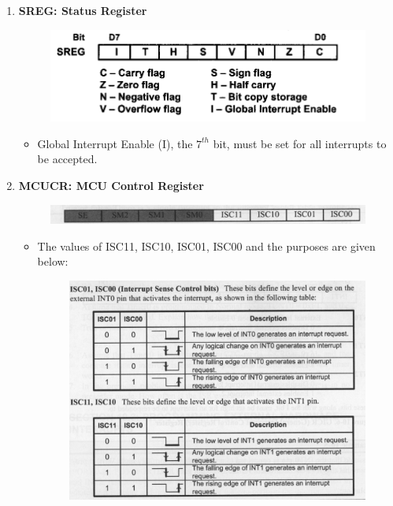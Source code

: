 \documentclass[titlepage, 11pt]{article}
\begin{document}
\begin{enumerate}
    \item \textbf{SREG: Status Register}
    \begin{figure}[H]
        \centering
        \includegraphics[width=0.75\linewidth]{SREG.png}
    \end{figure}
        \begin{itemize}
            \item Global Interrupt Enable (I), the $7^{th}$ bit, must be set for all interrupts to be accepted.
        \end{itemize}
    
    
    \item \textbf{MCUCR: MCU Control Register}
    \begin{figure}[H]
        \centering
        \includegraphics[width=1\linewidth]{MCUCR.png}  
    \end{figure}
        \begin{itemize}
            \item The values of ISC11, ISC10, ISC01, ISC00 and the purposes are given below:
            \begin{figure}[H]
                \centering
                \includegraphics[width=0.8\linewidth]{INT0_and_INT1.png}
            \end{figure}
        \end{itemize}
    

\end{enumerate}
\end{document}
